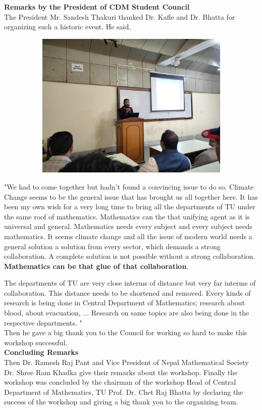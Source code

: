 \documentclass[a4paper,12pt]{report}
\begin{document}
{\bfseries \large Remarks by the President of CDM Student Council}\\
The President Mr. Sandesh Thakuri thanked Dr. Kafle and Dr. Bhatta for organizing such a historic event. He said,
\begin{figure}[h!]
  \centering
  \includegraphics[width=12cm, height=7cm]{president.jpg}
\end{figure}
\vspace{3mm}
"We had to come together but hadn't found a convincing issue to do so. Climate Change seems to be the general issue that has brought us all together here. It has been my own wish for a very long time to bring all the departments of TU under the same roof of mathematics. Mathematics can the that unifying agent as it is universal and general. Mathematics needs every subject and every subject needs mathematics. It seems climate change and all the issue of modern world needs a general solution a solution from every sector, which demands a strong collaboration. A complete solution is not possible without a strong collaboration. \textbf{Mathematics can be that glue of that collaboration}.
\clearpage

The departments of TU are very close interms of distance but very far interms of collaboration. This distance needs to be shortened and removed. Every kinds of research is being done in Central Department of Mathematics; research about blood, about evacuation, ... Research on same topics are also being done in the respective departments.
"\\
Then he gave a big thank you to the Council for working so hard to make this workshop successful.\\[7mm]

{\bfseries \large Concluding Remarks}\\[3mm]
Then Dr. Ramesh Raj Pant and Vice President of Nepal Mathematical Society Dr. Shree Ram Khadka give their remarks about the workshop. Finally the workshop was concluded by the chairman of the workshop Head of Central Department of Mathematics, TU Prof. Dr. Chet Raj Bhatta by declaring the success of the workshop and giving a big thank you to the organizing team.\\[3mm]
\end{document}
